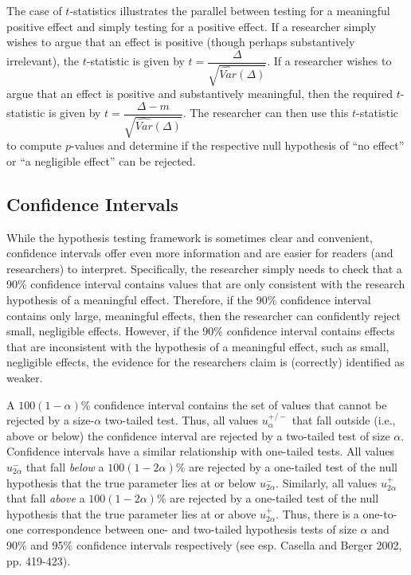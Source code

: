 \documentclass[12pt]{article}
\begin{document}
The case of $t$-statistics illustrates the parallel between testing for a meaningful positive effect and simply testing for a positive effect. If a researcher simply wishes to argue that an effect is positive (though perhaps substantively irrelevant), the $t$-statistic is given by $t = \dfrac{\Delta}{\sqrt{\widehat{Var}(\Delta)}}$. If a researcher wishes to argue that an effect is positive and substantively meaningful, then the required $t$-statistic is given by $t = \dfrac{\Delta - m}{\sqrt{\widehat{Var}(\Delta)}}$. The researcher can then use this $t$-statistic to compute $p$-values and determine if the respective null hypothesis of ``no effect'' or ``a negligible effect'' can be rejected.

\subsection*{Confidence Intervals}

While the hypothesis testing framework is sometimes clear and convenient, confidence intervals offer even more information and are easier for readers (and researchers) to interpret. Specifically, the researcher simply needs to check that a 90\% confidence interval contains values that are only consistent with the research hypothesis of a meaningful effect. Therefore, if the 90\% confidence interval contains only large, meaningful effects, then the researcher can confidently reject small, negligible effects. However, if the 90\% confidence interval contains effects that are inconsistent with the hypothesis of a meaningful effect, such as small, negligible effects, the evidence for the researchers claim is (correctly) identified as weaker. 

A $100(1-\alpha)$\% confidence interval contains the set of values that cannot be rejected by a size-$\alpha$ two-tailed test. Thus, all values $u^{+/-}_{\alpha}$ that fall outside (i.e., above or below) the confidence interval are rejected by a two-tailed test of size $\alpha$. Confidence intervals have a similar relationship with one-tailed tests. All values $u^{-}_{2\alpha}$ that fall \textit{below} a $100(1-2\alpha)$\% are rejected by a one-tailed test of the null hypothesis that the true parameter lies at or below $u^{-}_{2\alpha}$. Similarly, all values $u^{+}_{2\alpha}$ that fall \textit{above} a $100(1-2\alpha)$\% are rejected by a one-tailed test of the null hypothesis that the true parameter lies at or above $u^{+}_{2\alpha}$. Thus, there is a one-to-one correspondence between one- and two-tailed hypothesis tests of size $\alpha$ and 90\% and 95\% confidence intervals respectively (see esp. Casella and Berger 2002, pp. 419-423).
\end{document}
